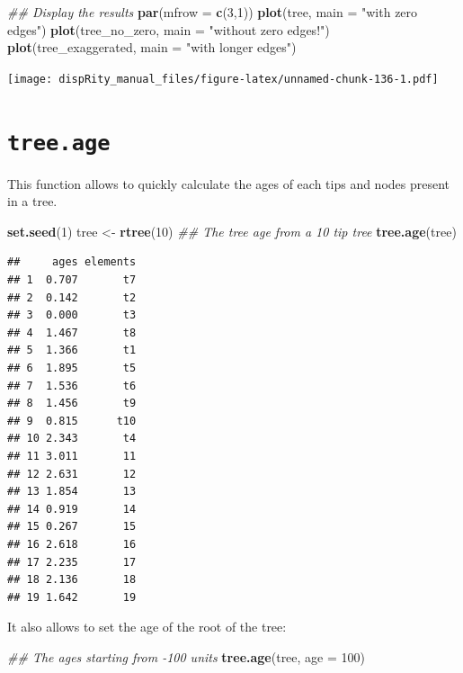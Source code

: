 \documentclass[]{book}
\newenvironment{Shaded}{\begin{snugshade}}{\end{snugshade}}
\newcommand{\CommentTok}[1]{\textcolor[rgb]{0.56,0.35,0.01}{\textit{#1}}}
\newcommand{\DataTypeTok}[1]{\textcolor[rgb]{0.13,0.29,0.53}{#1}}
\newcommand{\DecValTok}[1]{\textcolor[rgb]{0.00,0.00,0.81}{#1}}
\newcommand{\KeywordTok}[1]{\textcolor[rgb]{0.13,0.29,0.53}{\textbf{#1}}}
\newcommand{\NormalTok}[1]{#1}
\newcommand{\StringTok}[1]{\textcolor[rgb]{0.31,0.60,0.02}{#1}}
\begin{document}
\begin{Shaded}
\begin{Highlighting}[]
\CommentTok{## Display the results}
\KeywordTok{par}\NormalTok{(}\DataTypeTok{mfrow =} \KeywordTok{c}\NormalTok{(}\DecValTok{3}\NormalTok{,}\DecValTok{1}\NormalTok{))}
\KeywordTok{plot}\NormalTok{(tree, }\DataTypeTok{main =} \StringTok{"with zero edges"}\NormalTok{)}
\KeywordTok{plot}\NormalTok{(tree_no_zero, }\DataTypeTok{main =} \StringTok{"without zero edges!"}\NormalTok{)}
\KeywordTok{plot}\NormalTok{(tree_exaggerated, }\DataTypeTok{main =} \StringTok{"with longer edges"}\NormalTok{)}
\end{Highlighting}
\end{Shaded}

\texttt{[image: dispRity\_manual\_files/figure-latex/unnamed-chunk-136-1.pdf]}

\hypertarget{tree.age}{%
\section{\texorpdfstring{\texttt{tree.age}}{tree.age}}\label{tree.age}}

This function allows to quickly calculate the ages of each tips and nodes present in a tree.

\begin{Shaded}
\begin{Highlighting}[]
\KeywordTok{set.seed}\NormalTok{(}\DecValTok{1}\NormalTok{)}
\NormalTok{tree <-}\StringTok{ }\KeywordTok{rtree}\NormalTok{(}\DecValTok{10}\NormalTok{)}
\CommentTok{## The tree age from a 10 tip tree}
\KeywordTok{tree.age}\NormalTok{(tree)}
\end{Highlighting}
\end{Shaded}

\begin{verbatim}
##     ages elements
## 1  0.707       t7
## 2  0.142       t2
## 3  0.000       t3
## 4  1.467       t8
## 5  1.366       t1
## 6  1.895       t5
## 7  1.536       t6
## 8  1.456       t9
## 9  0.815      t10
## 10 2.343       t4
## 11 3.011       11
## 12 2.631       12
## 13 1.854       13
## 14 0.919       14
## 15 0.267       15
## 16 2.618       16
## 17 2.235       17
## 18 2.136       18
## 19 1.642       19
\end{verbatim}

It also allows to set the age of the root of the tree:

\begin{Shaded}
\begin{Highlighting}[]
\CommentTok{## The ages starting from -100 units}
\KeywordTok{tree.age}\NormalTok{(tree, }\DataTypeTok{age =} \DecValTok{100}\NormalTok{)}
\end{Highlighting}
\end{Shaded}
\end{document}
